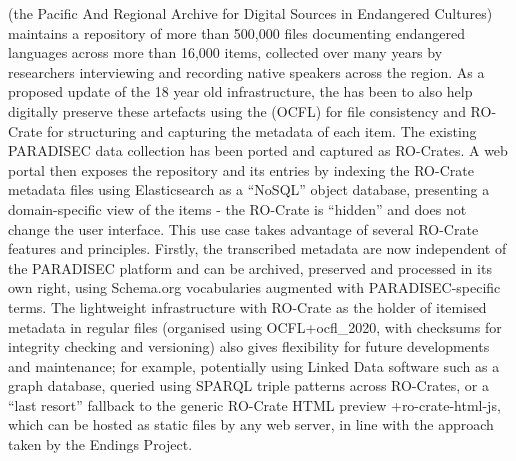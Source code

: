 \markdownRendererInterblockSeparator
{} (the Pacific And Regional Archive for Digital Sources in Endangered Cultures) maintains a repository of more than 500,000 files documenting endangered languages across more than 16,000 items, collected over many years by researchers interviewing and recording native speakers across the region. As a proposed update of the 18 year old infrastructure, the  has been  to also help digitally preserve these artefacts using the  (OCFL) for file consistency and RO-Crate for structuring and capturing the metadata of each item. The existing PARADISEC data collection has been ported and captured as RO-Crates. A web portal then exposes the repository and its entries by indexing the RO-Crate metadata files using Elasticsearch as a “NoSQL” object database, presenting a domain-specific view of the items - the RO-Crate is “hidden” and does not change the user interface.\markdownRendererInterblockSeparator
{}This use case takes advantage of several RO-Crate features and principles. Firstly, the transcribed metadata are now independent of the PARADISEC platform and can be archived, preserved and processed in its own right, using Schema.org vocabularies augmented with PARADISEC-specific terms. The lightweight infrastructure with RO-Crate as the holder of itemised metadata in regular files (organised using OCFL+{}{}{ocfl_2020}, with checksums for integrity checking and versioning) also gives flexibility for future developments and maintenance; for example, potentially using Linked Data software such as a graph database, queried using SPARQL triple patterns across RO-Crates, or a “last resort” fallback to the generic RO-Crate HTML preview +{}{}{ro-crate-html-js}, which can be hosted as static files by any web server, in line with the approach taken by the Endings Project.\relax